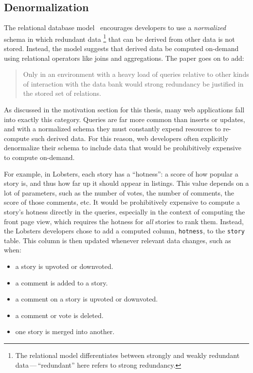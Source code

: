 \subsection{Denormalization}

The relational database model~\cite{relational} encourages developers to use
a \emph{normalized} schema in which redundant data%
\footnote{The relational model differentiates between strongly and weakly
redundant data\,---\,``redundant'' here refers to strong redundancy.}
that can be derived from other data is not stored. Instead, the model suggests
that derived data be computed on-demand using relational operators like joins
and aggregations. The paper goes on to add:

\begin{quote}
Only in an environment with a heavy load of queries relative to other kinds
of interaction with the data bank would strong redundancy be justified in the
stored set of relations.
\end{quote}

As discussed in the motivation section for this thesis, many web applications
fall into exactly this category. Queries are far more common than inserts or
updates, and with a normalized schema they must constantly expend resources to
re-compute such derived data. For this reason, web developers often explicitly
denormalize their schema to include data that would be prohibitively expensive
to compute on-demand.

For example, in Lobsters, each story has a ``hotness'': a score of how popular a
story is, and thus how far up it should appear in listings. This value depends
on a lot of parameters, such as the number of votes, the number of comments, the
score of those comments, etc. It would be prohibitively expensive to compute a
story's hotness directly in the queries, especially in the context of computing
the front page view, which requires the hotness for \emph{all} stories to rank
them. Instead, the Lobsters developers chose to add a computed column,
\texttt{hotness}, to the \texttt{story} table. This column is then updated
whenever relevant data changes, such as when:

\begin{itemize}
    \item a story is upvoted or downvoted.
    \item a comment is added to a story.
    \item a comment on a story is upvoted or downvoted.
    \item a comment or vote is deleted.
    \item one story is merged into another.
\end{itemize}

